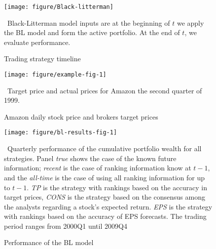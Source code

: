 \documentclass{article}\usepackage[]{graphicx}\usepackage[]{color}
\newcommand{\tr}{\textit{true}}
\newcommand{\naive}{\textit{recent}}
\newcommand{\default}{\textit{all-time}}
\begin{document}
\begin{figure}[h]
\begin{center}
\texttt{[image: figure/Black-litterman]}
\end{center}
\caption{Trading strategy timeline}
\label{fig:bl}
\ Black-Litterman model inputs are at the beginning of $t$ we apply the BL model and form the active portfolio. At the end of $t$, we evaluate performance.
\end{figure}


\begin{figure}[h]
\begin{center}
\texttt{[image: figure/example-fig-1]}
\end{center}
\caption{Amazon daily stock price and brokers target prices}
\label{fig:example}
\ Target price and actual prices for Amazon  the second quarter of 1999.
\end{figure}

\begin{figure}[h]
\begin{center}
\texttt{[image: figure/bl-results-fig-1]}
\end{center}
\caption{Performance of the BL model}
\label{fig:bl-results}
\ Quarterly performance of the cumulative portfolio wealth for all strategies. Panel \tr{} shows the case of the known future information; \naive{} is the case of ranking information know at $t-1$, and the \default{} is the case of using all ranking information for up to $t-1$. \textit{TP} is the strategy with rankings based on the accuracy in target prices, \textit{CONS} is the strategy based on the consensus among the analysts regarding a stock's expected return. \textit{EPS} is the strategy with rankings based on the accuracy of EPS forecasts. The trading period ranges from 2000Q1 until 2009Q4
\end{figure}
\end{document}
